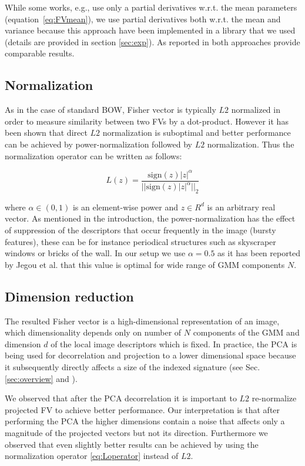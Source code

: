 \documentclass[table]{article} %
\newcommand\abs[1]{\left|#1\right|}
\newcommand\norm[1]{||#1||_2}
\begin{document}
		While some works, e.g.\cite{Perronnin2010}, use only a partial derivatives w.r.t. the mean parameters (equation~\eqref{eq:FVmean}), we use partial derivatives both w.r.t. the mean and variance because this approach have been implemented in a library that we used (details are provided in section \ref{sec:exp}). As reported in \cite{Jegou2010} both approaches provide comparable results.

		\subsection{Normalization}
			As in the case of standard BOW, Fisher vector is typically $L2$ normalized in order to measure similarity between two FVs by a dot-product. However it has been shown that direct $L2$ normalization is suboptimal and better performance can be achieved by power-normalization followed by $L2$ normalization. Thus the normalization operator can be written as follows:
			
			\begin{equation}
				L(z)=\dfrac{\text{sign} (z) \abs{z}^\alpha}{\norm{\text{sign}(z) \abs{z}^\alpha}}
				\label{eq:Loperator}
			\end{equation}

			\noindent
			where $\alpha \in (0,1)$ is an element-wise power and $z \in R^d$ is an arbitrary real vector. As mentioned in the introduction, the power-normalization has the effect of suppression of the descriptors that occur frequently in the image (bursty features), these can be for instance periodical structures such as skyscraper windows or bricks of the wall. In our setup we use $\alpha=0.5$ as it has been reported by Jegou et al. \cite{Jegou2012HAL} that this value is optimal for wide range of GMM components $N$.

		\subsection{Dimension reduction}
			The resulted Fisher vector is a high-dimensional representation of an image, which dimensionality depends only on number of $N$ components of the GMM and dimension $d$ of the local image descriptors which is fixed. In practice, the PCA is being used for decorrelation and projection to a lower dimensional space because it subsequently directly affects a size of the indexed signature (see Sec. \ref{sec:overview} and \cite{Jegou2011}).

			We observed that after the PCA decorrelation it is important to $L2$ re-normalize projected FV to achieve better performance. Our interpretation is that after performing the PCA the higher dimensions contain a noise that affects only a magnitude of the projected vectors but not its direction. Furthermore we observed that even slightly better results can be achieved by using the normalization operator \eqref{eq:Loperator} instead of $L2$.
\end{document}
